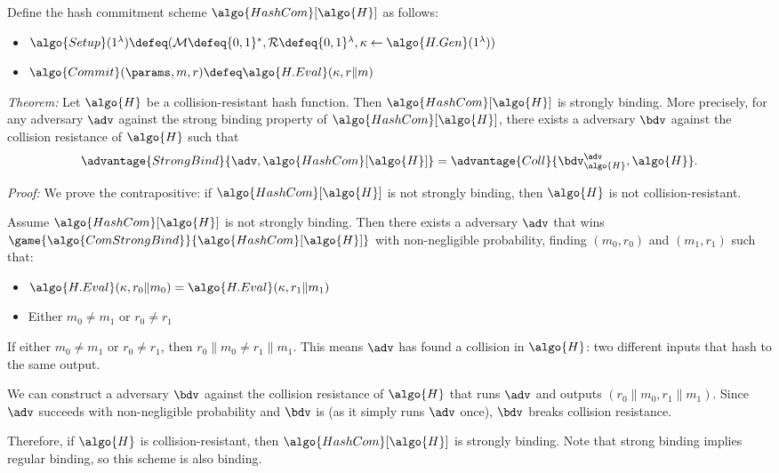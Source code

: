 \ifsolutions
\begin{mysolution}
  Define the hash commitment scheme $\algo{HashCom}[\algo{H}]$ as follows:
  \begin{itemize}
    \item $\algo{Setup}(1^\lambda) \defeq (\mathcal{M} \defeq \{0, 1\}^*, \mathcal{R} \defeq \{0, 1\}^\lambda, \kappa \gets \algo{H.Gen}(1^\lambda))$
    \item $\algo{Commit}(\params, m, r) \defeq \algo{H.Eval}(\kappa, r \| m)$
  \end{itemize}
  
  \emph{Theorem:} Let $\algo{H}$ be a collision-resistant hash function. Then $\algo{HashCom}[\algo{H}]$ is strongly binding.
  More precisely, for any \ppt adversary $\adv$ against the strong binding property of $\algo{HashCom}[\algo{H}]$, there exists a \ppt adversary $\bdv$ against the collision resistance of $\algo{H}$ such that
  \[
  \advantage{StrongBind}{\adv, \algo{HashCom}[\algo{H}]} = \advantage{Coll}{\bdv^\adv_\algo{H}, \algo{H}}.
  \]
  
  \emph{Proof:} We prove the contrapositive: if $\algo{HashCom}[\algo{H}]$ is not strongly binding, then $\algo{H}$ is not collision-resistant.
  
  Assume $\algo{HashCom}[\algo{H}]$ is not strongly binding.
  Then there exists a \ppt adversary $\adv$ that wins $\game{\algo{ComStrongBind}}{\algo{HashCom}[\algo{H}]}$ with non-negligible probability, finding $(m_0, r_0)$ and $(m_1, r_1)$ such that:
  \begin{itemize}
    \item $\algo{H.Eval}(\kappa, r_0 \| m_0) = \algo{H.Eval}(\kappa, r_1 \| m_1)$
    \item Either $m_0 \neq m_1$ or $r_0 \neq r_1$
  \end{itemize}
  
  If either $m_0 \neq m_1$ or $r_0 \neq r_1$, then $r_0 \| m_0 \neq r_1 \| m_1$.
  This means $\adv$ has found a collision in $\algo{H}$: two different inputs that hash to the same output.
  
  We can construct a \ppt adversary $\bdv$ against the collision resistance of $\algo{H}$ that runs $\adv$ and outputs $(r_0 \| m_0, r_1 \| m_1)$.
  Since $\adv$ succeeds with non-negligible probability and $\bdv$ is \ppt (as it simply runs $\adv$ once), $\bdv$ breaks collision resistance.
  
  Therefore, if $\algo{H}$ is collision-resistant, then $\algo{HashCom}[\algo{H}]$ is strongly binding.
  Note that strong binding implies regular binding, so this scheme is also binding.
\end{mysolution}
\fi


